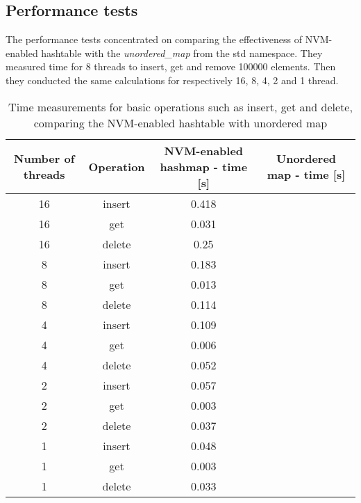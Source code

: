 \subsection{Performance tests}

    The performance tests concentrated on comparing the effectiveness of NVM-enabled hashtable with the \textit{unordered\_map} from the std namespace. They measured time for 8 threads to insert, get and remove 100000 elements. Then they conducted the same calculations for respectively 16, 8, 4, 2 and 1 thread. 

    \begin{table}[h]
    \caption{Time measurements for basic operations such as insert, get and delete, comparing the NVM-enabled hashtable with unordered map}\label{tab:tabela}
    \centering\footnotesize%
        \begin{tabular}{|c|c|c|c|} 
            \toprule
            Number of threads & Operation & NVM-enabled hashmap - time [s] & Unordered map - time [s] \\
            \midrule
            16 & insert & 0.418 & \\
            16 & get & 0.031 &    \\
            16 & delete & 0.25 &  \\
            \midrule
            8 & insert & 0.183 &  \\
            8 & get & 0.013 &     \\
            8 & delete & 0.114 &  \\
            \midrule
            4 & insert & 0.109 &  \\
            4 & get & 0.006 &     \\
            4 & delete & 0.052 &  \\
            \midrule
            2 & insert & 0.057 &  \\
            2 & get & 0.003 &     \\
            2 & delete & 0.037 &  \\
            \midrule
            1 & insert & 0.048 &  \\
            1 & get & 0.003 &     \\
            1 & delete & 0.033 &  \\
            \bottomrule
        \end{tabular}
    \end{table}


